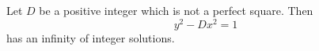 \begin{proposition}\label{eq:020}
    Let $D$ be a positive integer which is not a perfect square. Then
\[
    y^2-Dx^2=1
\]
    has an infinity of integer solutions.
\end{proposition}
